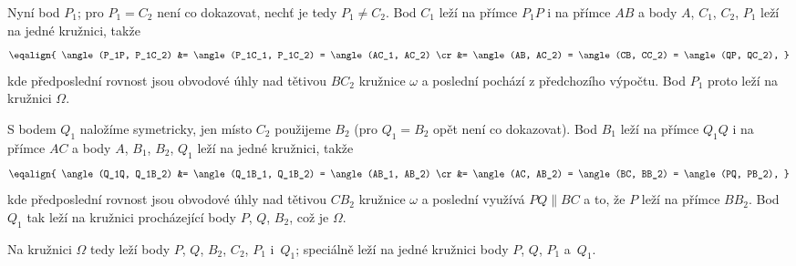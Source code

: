 {    Nyní bod $P_1$; pro $P_1 = C_2$ není co dokazovat, nechť je tedy $P_1 \neq C_2$. Bod $C_1$ leží na přímce $P_1P$ i na přímce $AB$ a body $A$, $C_1$, $C_2$, $P_1$ leží na jedné kružnici, takže
    $$
    \eqalign{
        \angle(P_1P, P_1C_2) &= \angle(P_1C_1, P_1C_2) = \angle(AC_1, AC_2) \cr
        &= \angle(AB, AC_2) = \angle(CB, CC_2) = \angle(QP, QC_2),
    }
    $$
    kde předposlední rovnost jsou obvodové úhly nad tětivou $BC_2$ kružnice $\omega$ a poslední pochází z předchozího výpočtu. Bod $P_1$ proto leží na kružnici $\Omega$.

    S bodem $Q_1$ naložíme symetricky, jen místo $C_2$ použijeme $B_2$ (pro $Q_1 = B_2$ opět není co dokazovat). Bod $B_1$ leží na přímce $Q_1Q$ i na přímce $AC$ a body $A$, $B_1$, $B_2$, $Q_1$ leží na jedné kružnici, takže
    $$
    \eqalign{
        \angle(Q_1Q, Q_1B_2) &= \angle(Q_1B_1, Q_1B_2) = \angle(AB_1, AB_2) \cr
        &= \angle(AC, AB_2) = \angle(BC, BB_2) = \angle(PQ, PB_2),
    }
    $$
    kde předposlední rovnost jsou obvodové úhly nad tětivou $CB_2$ kružnice $\omega$ a poslední využívá $PQ \parallel BC$ a to, že $P$ leží na přímce $BB_2$. Bod $Q_1$ tak leží na kružnici procházející body $P$, $Q$, $B_2$, což je $\Omega$.

    Na kružnici $\Omega$ tedy leží body $P$, $Q$, $B_2$, $C_2$, $P_1$ i~$Q_1$; speciálně leží na jedné kružnici body $P$, $Q$, $P_1$ a~$Q_1$.
}


